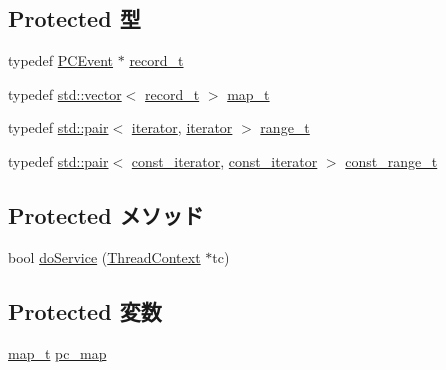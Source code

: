 \subsection*{Protected 型}
\begin{DoxyCompactItemize}
\item 
typedef \hyperlink{classPCEvent}{PCEvent} $\ast$ \hyperlink{classPCEventQueue_a0d238315b10c4db15cb81a537feeb907}{record\_\-t}
\item 
typedef \hyperlink{classstd_1_1vector}{std::vector}$<$ \hyperlink{classPCEvent}{record\_\-t} $>$ \hyperlink{classPCEventQueue_a5ea93a71647f298ad98b01e4aa156721}{map\_\-t}
\item 
typedef \hyperlink{classstd_1_1pair}{std::pair}$<$ \hyperlink{classPCEventQueue_a02720ab92b997d08a475408a87a9a378}{iterator}, \hyperlink{classPCEventQueue_a02720ab92b997d08a475408a87a9a378}{iterator} $>$ \hyperlink{classPCEventQueue_a25395d8f6c965039772100efce59edcb}{range\_\-t}
\item 
typedef \hyperlink{classstd_1_1pair}{std::pair}$<$ \hyperlink{classPCEventQueue_a1b1044fb589ffa9451ee2a57f7649293}{const\_\-iterator}, \hyperlink{classPCEventQueue_a1b1044fb589ffa9451ee2a57f7649293}{const\_\-iterator} $>$ \hyperlink{classPCEventQueue_a370a51098cf287e4725f0d54462fa1b5}{const\_\-range\_\-t}
\end{DoxyCompactItemize}
\subsection*{Protected メソッド}
\begin{DoxyCompactItemize}
\item 
bool \hyperlink{classPCEventQueue_a52d7ad71fc18d1ed1be0caccabfacf6a}{doService} (\hyperlink{classThreadContext}{ThreadContext} $\ast$tc)
\end{DoxyCompactItemize}
\subsection*{Protected 変数}
\begin{DoxyCompactItemize}
\item 
\hyperlink{classstd_1_1vector}{map\_\-t} \hyperlink{classPCEventQueue_a2e55562092a0fea15421a9591ea20223}{pc\_\-map}
\end{DoxyCompactItemize}


